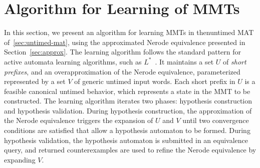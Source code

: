 
\section{Algorithm for Learning of MMTs}
\label{sec:learning}

In this section, we present an algorithm for learning MMTs in thenuntimed
MAT of~\ref{sec:untimed-mat}, using the approximated Nerode equivalence
presented in Section~\ref{sec:approx}.
The learning algorithm follows the standard pattern for active automata learning
algorithms, such as $L^*$~\cite{Ang87}. It maintains
a set $U$ of {\em short prefixes}, and
  an overapproximation of the Nerode equivalence,
  parameterized represented by a set $V$ of generic untimed input words.
Each short prefix in $U$ is a feasible canonical untimed
behavior, which represents a state in the MMT to be constructed.
The learning algorithm iterates two phases: hypothesis construction and
hypothesis validation.
During hypothesis construction,
the approximation of the Nerode equivalence triggers the expansion of
$U$ and $V$ until two convergence conditions are satisfied that allow
a hypothesis automaton to be formed.
During hypothesis validation, the hypothesis automaton is submitted in an
equivalence query, and returned counterexamples are used to refine
the Nerode equivalence by expanding $V$.


